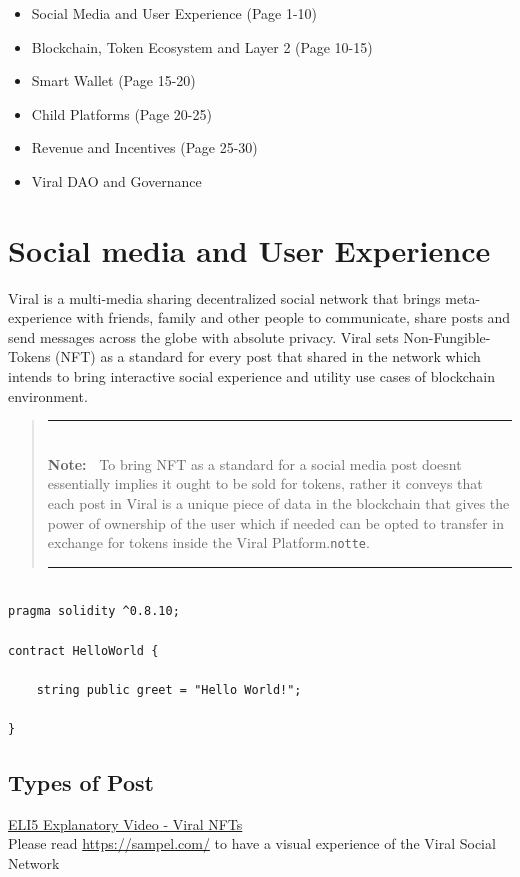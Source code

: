 \documentclass[10pt]{article}
\newlength{\Lnote}
\newcommand{\notte}[1]
     {\addtolength{\leftmargini}{1em}
        \settowidth{\Lnote}{\textbf{Note:~}}
        \begin{quote}
            \rule{\dimexpr\textwidth-2\leftmargini}{1pt}\\
                        \mbox{}\hspace{-\Lnote}\textbf{Note:~}%
                                            #1\\[-0.5ex] 
            \rule{\dimexpr\textwidth-2\leftmargini}{1pt}
        \end{quote}
        \addtolength{\leftmargini}{-4em}}
\begin{document}
\begin{itemize}
\item Social Media and User Experience (Page 1-10)
\item Blockchain, Token Ecosystem and Layer 2 (Page 10-15)
\item Smart Wallet (Page 15-20)
\item Child Platforms (Page 20-25)
\item Revenue and Incentives (Page 25-30)
\item Viral DAO  and Governance
\end{itemize}

\section{Social media and User Experience}
Viral is a multi-media sharing decentralized social network that brings meta-experience with friends, family and other people to communicate, share posts and send messages across the globe with absolute privacy. Viral sets Non-Fungible-Tokens (NFT) as a standard for every post that shared in the network which intends to bring interactive social experience and utility use cases of blockchain environment.\\

\notte{To bring NFT as a standard for a social media post doesn\textsc{\char13}t essentially implies it ought to be sold for tokens, rather it conveys that each post in Viral is a unique piece of data in the blockchain that gives the power of ownership of the user which if needed can be opted to transfer in exchange for tokens inside the Viral Platform.\texttt{notte}.}

\begin{lstlisting}[language=Solidity, caption={NFT Snippet for Enable/Disable Open Sale}]

pragma solidity ^0.8.10;

contract HelloWorld {

    string public greet = "Hello World!";
    
}
\end{lstlisting}

\subsection{Types of Post}
\hyperlink{https://sample.com}{ELI5 Explanatory Video - Viral NFTs}\\

Please read \hyperlink{App Brouchure}{https://sampel.com/} to have a visual experience of the Viral Social Network\\
\end{document}
